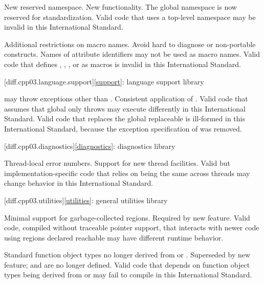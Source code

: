 \change
New reserved namespace.
\rationale
New functionality.
\effect
The global namespace  is now reserved for standardization. Valid
\CppIII{} code that uses a top-level namespace  may be invalid in
this International Standard.

\change
Additional restrictions on macro names.
\rationale
Avoid hard to diagnose or non-portable constructs.
\effect
Names of attribute identifiers may not be used as macro names. Valid \CppIII{}
code that defines , ,
, or  as macros is invalid in this
International Standard.

[diff.cpp03.language.support]{\ref{support}:
language support library}

\change
{} may throw exceptions other than
.
\rationale
Consistent application of .
\effect
Valid \CppIII{} code that assumes that global  only
throws  may execute differently in this International
Standard.
Valid \CppIII{} code that replaces the global replaceable 
is ill-formed in this International Standard,
because the exception specification of 
was removed.

[diff.cpp03.diagnostics]{\ref{diagnostics}: diagnostics library}

\change
Thread-local error numbers.
\rationale
Support for new thread facilities.
\effect
Valid but implementation-specific \CppIII{} code that relies on
 being the same across threads may change behavior in this
International Standard.

[diff.cpp03.utilities]{\ref{utilities}: general utilities library}

\change
Minimal support for garbage-collected regions.
\rationale
Required by new feature.
\effect
Valid \CppIII{} code, compiled without traceable pointer support,
that interacts with newer \Cpp{} code using regions declared reachable may
have different runtime behavior.

\change
Standard function object types no longer derived from
 or .
\rationale
Superseded by new feature;  and
 are no longer defined.
\effect
Valid \CppIII{} code that depends on function object types being derived from
 or  may fail to compile
in this International Standard.

